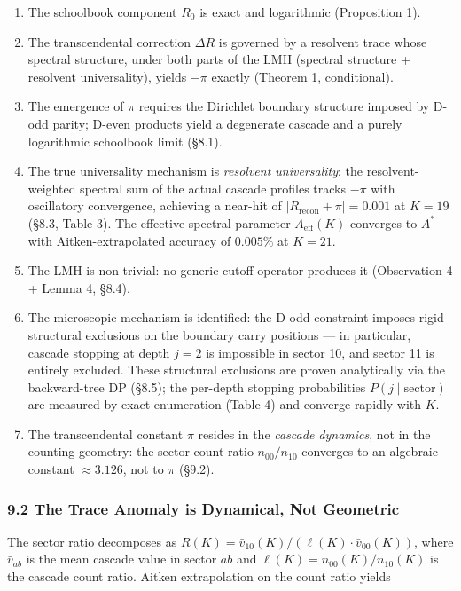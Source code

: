 \documentclass[
  11pt,
]{article}
\providecommand{\tightlist}{%
  \setlength{\itemsep}{0pt}\setlength{\parskip}{0pt}}
\begin{document}
\begin{enumerate}
\def\labelenumi{\arabic{enumi}.}
\tightlist
\item
  The schoolbook component \(R_0\) is exact and logarithmic (Proposition 1).
\item
  The transcendental correction \(\Delta R\) is governed by a resolvent trace
  whose spectral structure, under both parts of the LMH (spectral structure +
  resolvent universality), yields \(-\pi\) exactly (Theorem 1, conditional).
\item
  The emergence of \(\pi\) requires the Dirichlet boundary structure imposed by
  D-odd parity; D-even products yield a degenerate cascade and a purely
  logarithmic schoolbook limit (§8.1).
\item
  The true universality mechanism is \emph{resolvent universality}: the
  resolvent-weighted spectral sum of the actual cascade profiles tracks \(-\pi\)
  with oscillatory convergence, achieving a near-hit of
  \(|R_{\mathrm{recon}} + \pi| = 0.001\) at \(K = 19\) (§8.3, Table 3). The
  effective spectral parameter \(A_{\mathrm{eff}}(K)\) converges to \(A^{\ast}\)
  with Aitken-extrapolated accuracy of \(0.005\%\) at \(K = 21\).
\item
  The LMH is non-trivial: no generic cutoff operator produces it (Observation 4
  + Lemma 4, §8.4).
\item
  The microscopic mechanism is identified: the D-odd constraint imposes rigid
  structural exclusions on the boundary carry positions --- in particular,
  cascade stopping at depth \(j = 2\) is impossible in sector 10, and sector 11
  is entirely excluded. These structural exclusions are proven analytically via
  the backward-tree DP (§8.5); the per-depth stopping probabilities
  \(P(j \mid \text{sector})\) are measured by exact enumeration (Table 4) and
  converge rapidly with \(K\).
\item
  The transcendental constant \(\pi\) resides in the \emph{cascade dynamics},
  not in the counting geometry: the sector count ratio \(n_{00}/n_{10}\)
  converges to an algebraic constant \(\approx 3.126\), not to \(\pi\) (§9.2).
\end{enumerate}

\subsubsection{9.2 The Trace Anomaly is Dynamical, Not
Geometric}\label{the-trace-anomaly-is-dynamical-not-geometric}

The sector ratio decomposes as
\(R(K) = \bar{v}_{10}(K) / (\ell(K) \cdot \bar{v}_{00}(K))\), where
\(\bar{v}_{ab}\) is the mean cascade value in sector \(ab\) and
\(\ell(K) = n_{00}(K)/n_{10}(K)\) is the cascade count ratio. Aitken
extrapolation on the count ratio yields
\end{document}

